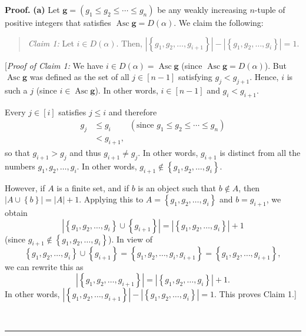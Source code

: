 \documentclass[numbers=enddot,12pt,final,onecolumn,notitlepage]{scrartcl}%
\theoremstyle{definition}
\newenvironment{statement}{\begin{quote}}{\end{quote}}
\newenvironment{proof}[1][Proof]{\noindent\textbf{#1.} }{\ \rule{0.5em}{0.5em}}
\newenvironment{verlong}{}{}
\begin{document}
\begin{verlong}
\begin{proof}
\textbf{(a)} Let $\mathbf{g}=\left(  g_{1}\leq g_{2}\leq\cdots\leq
g_{n}\right)  $ be any weakly increasing $n$-tuple of positive integers that
satisfies $\operatorname*{Asc}\mathbf{g}=D\left(  \alpha\right)  $. We claim
the following:

\begin{statement}
\textit{Claim 1:} Let $i\in D\left(  \alpha\right)  $. Then, $\left\vert
\left\{  g_{1},g_{2},\ldots,g_{i+1}\right\}  \right\vert -\left\vert \left\{
g_{1},g_{2},\ldots,g_{i}\right\}  \right\vert =1$.
\end{statement}

[\textit{Proof of Claim 1:} We have $i\in D\left(  \alpha\right)
=\operatorname*{Asc}\mathbf{g}$ (since $\operatorname*{Asc}\mathbf{g}=D\left(
\alpha\right)  $). But $\operatorname*{Asc}\mathbf{g}$ was defined as the set
of all $j\in\left[  n-1\right]  $ satisfying $g_{j}<g_{j+1}$. Hence, $i$ is
such a $j$ (since $i\in\operatorname*{Asc}\mathbf{g}$). In other words,
$i\in\left[  n-1\right]  $ and $g_{i}<g_{i+1}$.

Every $j\in\left[  i\right]  $ satisfies $j\leq i$ and therefore%
\begin{align*}
g_{j}  &  \leq g_{i}\ \ \ \ \ \ \ \ \ \ \left(  \text{since }g_{1}\leq
g_{2}\leq\cdots\leq g_{n}\right) \\
&  <g_{i+1},
\end{align*}
so that $g_{i+1}>g_{j}$ and thus $g_{i+1}\neq g_{j}$. In other words,
$g_{i+1}$ is distinct from all the numbers $g_{1},g_{2},\ldots,g_{i}$. In
other words, $g_{i+1}\notin\left\{  g_{1},g_{2},\ldots,g_{i}\right\}  $.

However, if $A$ is a finite set, and if $b$ is an object such that $b\notin
A$, then $\left\vert A\cup\left\{  b\right\}  \right\vert =\left\vert
A\right\vert +1$. Applying this to $A=\left\{  g_{1},g_{2},\ldots
,g_{i}\right\}  $ and $b=g_{i+1}$, we obtain
\[
\left\vert \left\{  g_{1},g_{2},\ldots,g_{i}\right\}  \cup\left\{
g_{i+1}\right\}  \right\vert =\left\vert \left\{  g_{1},g_{2},\ldots
,g_{i}\right\}  \right\vert +1
\]
(since $g_{i+1}\notin\left\{  g_{1},g_{2},\ldots,g_{i}\right\}  $). In view
of
\[
\left\{  g_{1},g_{2},\ldots,g_{i}\right\}  \cup\left\{  g_{i+1}\right\}
=\left\{  g_{1},g_{2},\ldots,g_{i},g_{i+1}\right\}  =\left\{  g_{1}%
,g_{2},\ldots,g_{i+1}\right\}  ,
\]
we can rewrite this as%
\[
\left\vert \left\{  g_{1},g_{2},\ldots,g_{i+1}\right\}  \right\vert
=\left\vert \left\{  g_{1},g_{2},\ldots,g_{i}\right\}  \right\vert +1.
\]
In other words, $\left\vert \left\{  g_{1},g_{2},\ldots,g_{i+1}\right\}
\right\vert -\left\vert \left\{  g_{1},g_{2},\ldots,g_{i}\right\}  \right\vert
=1$. This proves Claim 1.]


\end{proof}
\end{verlong}
\end{document}
